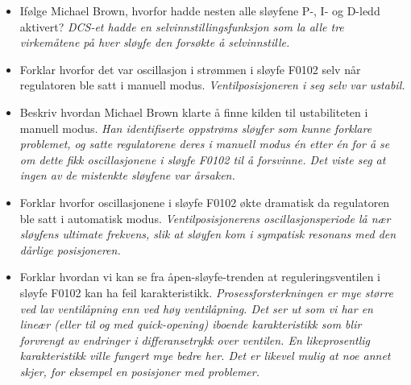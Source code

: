 \begin{itemize}
\item{} Ifølge Michael Brown, hvorfor hadde nesten alle sløyfene P-, I- og D-ledd aktivert? {\it DCS-et hadde en selvinnstillingsfunksjon som la alle tre virkemåtene på hver sløyfe den forsøkte å selvinnstille.}
\item{} Forklar hvorfor det var oscillasjon i strømmen i sløyfe F0102 selv når regulatoren ble satt i manuell modus. {\it Ventilposisjoneren i seg selv var ustabil.}
\item{} Beskriv hvordan Michael Brown klarte å finne kilden til ustabiliteten i manuell modus. {\it Han identifiserte oppstrøms sløyfer som kunne forklare problemet, og satte regulatorene deres i manuell modus én etter én for å se om dette fikk oscillasjonene i sløyfe F0102 til å forsvinne. Det viste seg at ingen av de mistenkte sløyfene var årsaken.}
\item{} Forklar hvorfor oscillasjonene i sløyfe F0102 økte dramatisk da regulatoren ble satt i automatisk modus. {\it Ventilposisjonerens oscillasjonsperiode lå nær sløyfens ultimate frekvens, slik at sløyfen kom i sympatisk resonans med den dårlige posisjoneren.}
\item{} Forklar hvordan vi kan se fra åpen-sløyfe-trenden at reguleringsventilen i sløyfe F0102 kan ha feil karakteristikk. {\it Prosessforsterkningen er mye større ved lav ventilåpning enn ved høy ventilåpning. Det ser ut som vi har en lineær (eller til og med quick-opening) iboende karakteristikk som blir forvrengt av endringer i differansetrykk over ventilen. En likeprosentlig karakteristikk ville fungert mye bedre her. Det er likevel mulig at noe annet skjer, for eksempel en posisjoner med problemer.}
\end{itemize}





